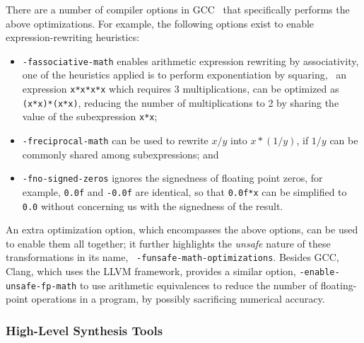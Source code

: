 There are a number of compiler options in GCC~\cite{gcc} that specifically
performs the above optimizations.  For example, the following options exist to
enable expression-rewriting heuristics:
\begin{itemize}

    \item \verb|-fassociative-math| enables arithmetic expression rewriting by
    associativity, one of the heuristics applied is to perform exponentiation
    by squaring, \eg~an expression \verb|x*x*x*x| which requires 3
    multiplications, can be optimized as \verb|(x*x)*(x*x)|, reducing the
    number of multiplications to 2 by sharing the value of the subexpression
    \verb|x*x|;

    \item \verb|-freciprocal-math| can be used to rewrite $x / y$ into $x * (1
    / y)$, if $1 / y$ can be commonly shared among subexpressions; and

    \item \verb|-fno-signed-zeros| ignores the signedness of floating point
    zeros, for example, \verb|0.0f| and \verb|-0.0f| are identical, so that
    \verb|0.0f*x| can be simplified to \verb|0.0| without concerning us with
    the signedness of the result.

\end{itemize}

An extra optimization option, which encompasses the above options, can be used
to enable them all together; it further highlights the \emph{unsafe} nature
of these transformations in its name, \ie~\verb|-funsafe-math-optimizations|.
Besides GCC, Clang, which uses the LLVM framework, provides a similar option,
\verb|-enable-unsafe-fp-math| to use arithmetic equivalences to reduce the
number of floating-point operations in a program, by possibly sacrificing
numerical accuracy.


\subsubsection{High-Level Synthesis Tools}

